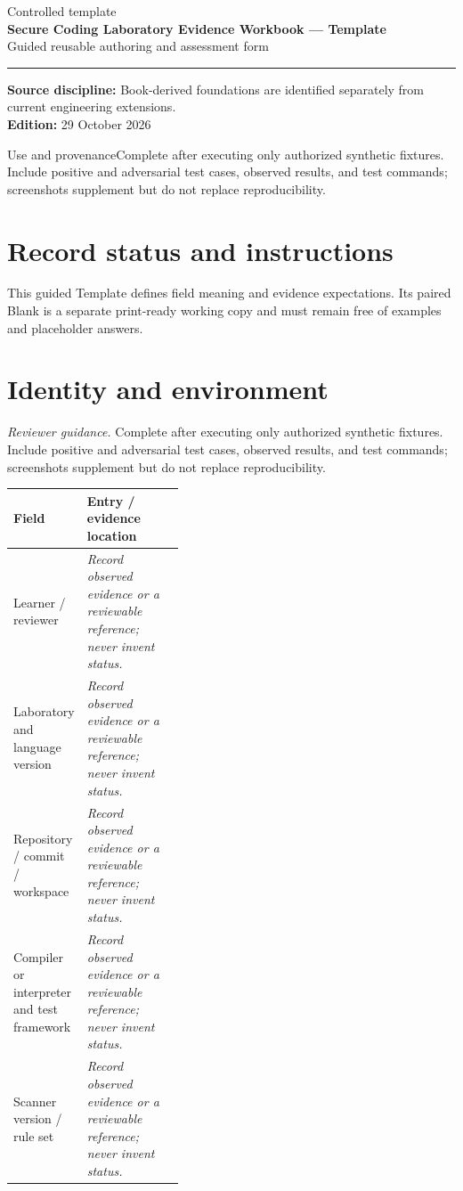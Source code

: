 \documentclass[10pt,letterpaper]{article}
\begin{document}
\hypersetup{pageanchor=false}%
\begin{titlepage}
\raggedright
\setlength{\parindent}{0pt}
\vspace*{1.0in}
{\color{bluegray}\Large Controlled template}\\[1.0em]
{\color{navy}\Huge\bfseries Secure Coding Laboratory Evidence Workbook --- Template}\\[0.7em]
{\Large Guided reusable authoring and assessment form}\\[2.0em]
\rule{\linewidth}{1.0pt}
\vfill
\textbf{Source discipline:} Book-derived foundations are identified separately from current engineering extensions.\\
\textbf{Edition:} 29 October 2026
\end{titlepage}\hypersetup{pageanchor=true}
\tableofcontents
\clearpage
\begin{focusbox}{Use and provenance}Complete after executing only authorized synthetic fixtures. Include positive and adversarial test cases, observed results, and test commands; screenshots supplement but do not replace reproducibility.\end{focusbox}
\section{Record status and instructions}
This guided Template defines field meaning and evidence expectations. Its paired Blank is a separate print-ready working copy and must remain free of examples and placeholder answers.

\section{Identity and environment}
\textit{Reviewer guidance.} Complete after executing only authorized synthetic fixtures. Include positive and adversarial test cases, observed results, and test commands; screenshots supplement but do not replace reproducibility.
\begin{tabularx}{\linewidth}{@{}p{0.38\linewidth}Y@{}}
\toprule Field & Entry / evidence location\\\midrule
Learner / reviewer & \textit{Record observed evidence or a reviewable reference; never invent status.}\\[1.0em]
\midrule
Laboratory and language version & \textit{Record observed evidence or a reviewable reference; never invent status.}\\[1.0em]
\midrule
Repository / commit / workspace & \textit{Record observed evidence or a reviewable reference; never invent status.}\\[1.0em]
\midrule
Compiler or interpreter and test framework & \textit{Record observed evidence or a reviewable reference; never invent status.}\\[1.0em]
\midrule
Scanner version / rule set & \textit{Record observed evidence or a reviewable reference; never invent status.}\\[1.0em]
\midrule
\end{tabularx}
\end{document}
